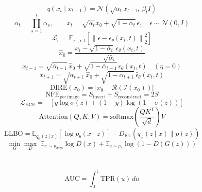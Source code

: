 \[
q(x_t\mid x_{t-1})=\mathcal{N}\!\left(\sqrt{\alpha_t}x_{t-1},\,\beta_t I\right)
\]
\[
\bar{\alpha}_t=\prod_{s=1}^{t}\alpha_s,\qquad x_t=\sqrt{\bar{\alpha}_t}x_0+\sqrt{1-\bar{\alpha}_t}\,\epsilon,
\quad \epsilon\sim\mathcal{N}(0,I)
\]
\[
\mathcal{L}_{\epsilon}=\mathbb{E}_{x_0,\epsilon,t}\left[\left\|\epsilon-\epsilon_{\theta}(x_t,t)\right\|_2^2\right]
\]
\[
\hat{x}_0=\frac{x_t-\sqrt{1-\bar{\alpha}_t}\,\epsilon_{\theta}(x_t,t)}{\sqrt{\bar{\alpha}_t}}
\]
\[
x_{t-1}=\sqrt{\bar{\alpha}_{t-1}}\,\hat{x}_0+\sqrt{1-\bar{\alpha}_{t-1}}\,\epsilon_{\theta}(x_t,t)\quad(\eta=0)
\]
\[
x_{t+1}=\sqrt{\bar{\alpha}_{t+1}}\,\hat{x}_0+\sqrt{1-\bar{\alpha}_{t+1}}\,\hat{\epsilon}_{\theta}(x_t,t)
\]
\[
\mathrm{DIRE}(x_0)=\left|x_0-\mathcal{R}\!\left(\mathcal{I}(x_0)\right)\right|
\]
\[
\mathrm{NFE}_{\mathrm{per\ image}}=S_{\mathrm{invert}}+S_{\mathrm{reconstruct}}=2S
\]
\[
\mathcal{L}_{\mathrm{BCE}}=-\left[y\log\sigma(z)+(1-y)\log\left(1-\sigma(z)\right)\right]
\]
\[
\mathrm{Attention}(Q,K,V)=\mathrm{softmax}\!\left(\frac{QK^{\mathsf T}}{\sqrt{d}}\right)V
\]
\[
\mathrm{ELBO}=\mathbb{E}_{q_\phi(z\mid x)}[\log p_\theta(x\mid z)]-D_{\mathrm{KL}}(q_\phi(z\mid x)\parallel p(z))
\]
\[
\min_G\max_D\;\mathbb{E}_{x\sim p_{data}}\log D(x)+\mathbb{E}_{z\sim p_z}\log(1-D(G(z)))
\]
\\[
z_q=e_{k^*},\qquad k^*=\arg\min_k\|z_e-e_k\|_2
\\]
\\[
\log p_X(x)=\log p_Z(f(x))+\log\left|\det J_f(x)\right|
\]
\[
\mathrm{ACC}(\tau)=\frac{1}{N}\sum_{i=1}^{N}\mathbf{1}\!\left[(s_i>\tau)=y_i\right]
\]
\[
\mathrm{AUC}=\int_0^1\mathrm{TPR}(u)\,du
\]
